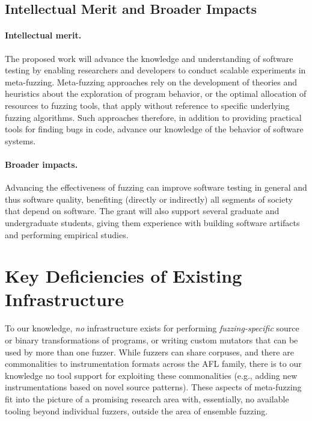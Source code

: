 \subsection{Intellectual Merit and Broader Impacts}

\paragraph{Intellectual merit.} The proposed work will advance the
knowledge and understanding of software testing by enabling
researchers and developers to conduct scalable experiments in meta-fuzzing.  
Meta-fuzzing approaches rely on the development of theories and heuristics 
about the exploration of program behavior, or the optimal allocation of 
resources to fuzzing tools, that apply without reference to specific underlying 
fuzzing algorithms.  Such approaches therefore, in addition to providing 
practical tools for finding bugs in code, advance our knowledge of the behavior 
of software systems.

\paragraph{Broader impacts.} Advancing the effectiveness of fuzzing can improve 
software testing in general and
thus software quality, benefiting (directly or indirectly) all
segments of society that depend on software.  The grant
will also support several graduate and undergraduate students, giving them 
experience with
building software artifacts and performing empirical studies.


\section{Key Deficiencies of Existing Infrastructure}

To our knowledge, \emph{no} infrastructure exists for performing 
\emph{fuzzing-specific} source or binary transformations of programs, or writing 
custom mutators that can be used by more than one fuzzer.  While
fuzzers can share corpuses, and there are commonalities to
instrumentation formats across the AFL family, there is to our
knowledge no tool support for exploiting these commonalities (e.g.,
adding new instrumentations based on novel source patterns).  These aspects of meta-fuzzing fit into the picture of a promising 
research area with, essentially, no available tooling beyond individual 
fuzzers, outside the area of ensemble fuzzing.


